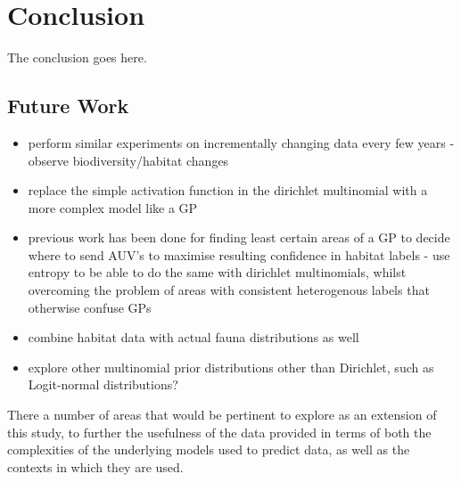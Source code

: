 \chapter{Conclusion} \label{chap:conclusion}

The conclusion goes here.

\section{Future Work}

\begin{itemize}
    \item perform similar experiments on incrementally changing data every few years - observe biodiversity/habitat changes
    \item replace the simple activation function in the dirichlet multinomial with a more complex model like a GP
    \item previous work has been done for finding least certain areas of a GP to decide where to send AUV's to maximise resulting confidence in habitat labels - use entropy to be able to do the same with dirichlet multinomials, whilst overcoming the problem of areas with consistent heterogenous labels that otherwise confuse GPs
    \item combine habitat data with actual fauna distributions as well
    \item explore other multinomial prior distributions other than Dirichlet, such as Logit-normal distributions?
\end{itemize}

There a number of areas that would be pertinent to explore as an extension of this study, to further the usefulness of the data provided in terms of both the complexities of the underlying models used to predict data, as well as the contexts in which they are used.



